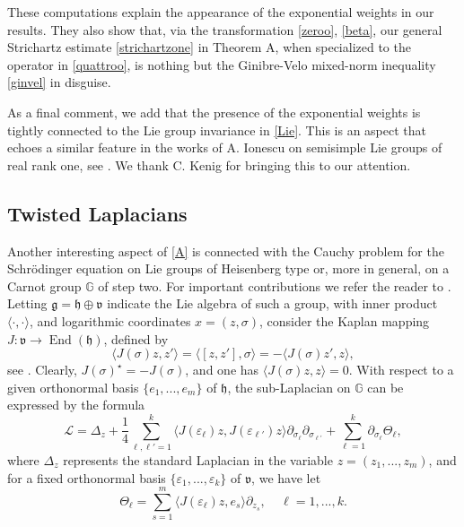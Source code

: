 \documentclass[11pt,letter]{amsart}
\newcommand{\p}{\partial}
\newcommand{\bG}{\mathbb {G}}
\newcommand{\bg}{\mathfrak g}
\numberwithin{equation}{section}
\newcommand{\ve}{\varepsilon}
\numberwithin{equation}{section}
\begin{document}
These computations explain the appearance of the exponential weights in our results. They also show that, via the transformation \eqref{zeroo}, \eqref{beta}, our general Strichartz estimate \eqref{strichartzone} in Theorem A, when specialized to the operator in \eqref{quattroo}, is nothing but  the Ginibre-Velo mixed-norm inequality \eqref{ginvel} in disguise.
 
As a final comment, we add that the presence of the exponential weights is tightly connected to the Lie group invariance in \eqref{Lie}. This is an aspect that echoes a similar feature in the works of A. Ionescu on semisimple Lie groups of real rank one, see \cite{Iomrl, Iojfa, Iojfa2, Ioann,  Ioduke}. We thank C. Kenig for bringing this to our attention.   



\subsection{Twisted Laplacians} Another interesting aspect of \eqref{A} is connected with the Cauchy problem for the Schr\"odinger equation on Lie groups of Heisenberg type or, more in general, on a Carnot group $\bG$ of step two. For important contributions we refer the reader to \cite{Mu, BG, BBG, BFG, BF}. Letting $\bg = \mathfrak h \oplus \mathfrak v$ indicate the Lie algebra of such a group, with inner product $\langle \cdot,\cdot\rangle$, and logarithmic coordinates $x = (z,\sigma)$, consider the Kaplan mapping $J: \mathfrak v \to \operatorname{End}(\mathfrak h)$, defined by 
\begin{equation}\label{kap}
\langle J(\sigma)z,z'\rangle = \langle [z,z'],\sigma\rangle = - \langle J(\sigma)z',z\rangle,
\end{equation}
see \cite{Ka}. Clearly, $J(\sigma)^\star = - J(\sigma)$, and one has $\langle J(\sigma)z,z\rangle = 0$. 
With respect to a given orthonormal basis $\{e_1,...,e_m\}$ of $\mathfrak h$, the sub-Laplacian on $\bG$ can be expressed by the formula
\begin{equation}\label{sl}
\mathscr L = \Delta_z + \frac 14 \sum_{\ell,\ell' = 1}^k \langle J(\ve_\ell)z,J(\ve_{\ell'})z\rangle \p_{\sigma_\ell}\p_{\sigma_{\ell'}} + \sum_{\ell = 1}^k  \p_{\sigma_\ell} \Theta_\ell,
\end{equation}
where $\Delta_z$ represents the standard Laplacian in the variable $z = (z_1,...,z_m)$, and for a fixed orthonormal basis $\{\ve_1,...,\ve_k\}$ of $\mathfrak v$, we have let \begin{equation}\label{thetaell0}
\Theta_\ell = \sum_{s=1}^m \langle J(\ve_\ell)z,e_s\rangle \p_{z_s},\ \ \ \ \ \ell = 1,...,k.
\end{equation}
\end{document}
